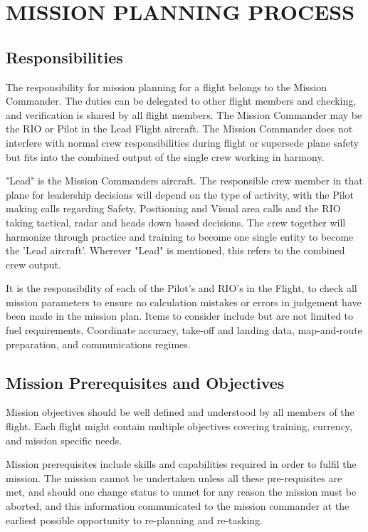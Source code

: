 \section{MISSION PLANNING PROCESS}

\subsection{Responsibilities}

The responsibility for mission planning for a flight belongs to the Mission
Commander. The duties can be delegated to other flight members and checking,
and verification is shared by all flight members. The Mission Commander may be
the RIO or Pilot in the Lead Flight aircraft. The Mission Commander does not
interfere with normal crew responsibilities during flight or supersede plane
safety but fits into the combined output of the single crew working in harmony.

"Lead" is the Mission Commanders aircraft. The responsible crew member in that
plane for leadership decisions will depend on the type of activity, with the
Pilot making calls regarding Safety, Positioning and Visual area calls and the
RIO taking tactical, radar and heads down based decisions. The crew together
will harmonize through practice and training to become one single entity to
become the 'Lead aircraft'. Wherever "Lead" is mentioned, this refers to the
combined crew output.

It is the responsibility of each of the Pilot's and RIO's in the Flight, to
check all mission parameters to ensure no calculation mistakes or errors in
judgement have been made in the mission plan. Items to consider include but are
not limited to fuel requirements, Coordinate accuracy, take-off and landing
data, map-and-route preparation, and communications regimes.

\subsection{Mission Prerequisites and Objectives}

Mission objectives should be well defined and understood by all members of the
flight. Each flight might contain multiple objectives covering training,
currency, and mission specific needs.

Mission prerequisites include skills and capabilities required in order to
fulfil the mission. The mission cannot be undertaken unless all these
pre-requisites are met, and should one change status to unmet for any reason
the mission must be aborted, and this information communicated to the mission
commander at the earliest possible opportunity to re-planning and re-tasking.

